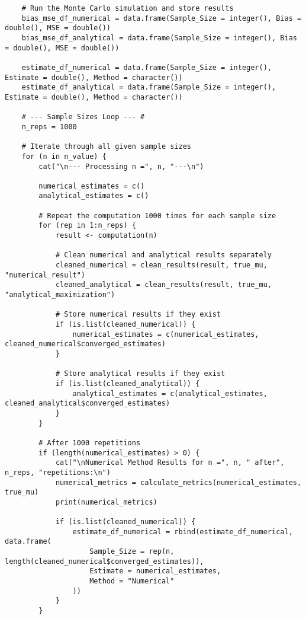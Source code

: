 \begin{verbatim}
    # Run the Monte Carlo simulation and store results
    bias_mse_df_numerical = data.frame(Sample_Size = integer(), Bias = double(), MSE = double())
    bias_mse_df_analytical = data.frame(Sample_Size = integer(), Bias = double(), MSE = double())

    estimate_df_numerical = data.frame(Sample_Size = integer(), Estimate = double(), Method = character())
    estimate_df_analytical = data.frame(Sample_Size = integer(), Estimate = double(), Method = character())

    # --- Sample Sizes Loop --- #
    n_reps = 1000

    # Iterate through all given sample sizes
    for (n in n_value) {
        cat("\n--- Processing n =", n, "---\n")

        numerical_estimates = c()
        analytical_estimates = c()

        # Repeat the computation 1000 times for each sample size
        for (rep in 1:n_reps) {
            result <- computation(n)

            # Clean numerical and analytical results separately
            cleaned_numerical = clean_results(result, true_mu, "numerical_result")
            cleaned_analytical = clean_results(result, true_mu, "analytical_maximization")

            # Store numerical results if they exist
            if (is.list(cleaned_numerical)) {
                numerical_estimates = c(numerical_estimates, cleaned_numerical$converged_estimates)
            }

            # Store analytical results if they exist
            if (is.list(cleaned_analytical)) {
                analytical_estimates = c(analytical_estimates, cleaned_analytical$converged_estimates)
            }
        }

        # After 1000 repetitions
        if (length(numerical_estimates) > 0) {
            cat("\nNumerical Method Results for n =", n, " after", n_reps, "repetitions:\n")
            numerical_metrics = calculate_metrics(numerical_estimates, true_mu)
            print(numerical_metrics)

            if (is.list(cleaned_numerical)) {
                estimate_df_numerical = rbind(estimate_df_numerical, data.frame(
                    Sample_Size = rep(n, length(cleaned_numerical$converged_estimates)),
                    Estimate = numerical_estimates,
                    Method = "Numerical"
                ))
            }
        }


\end{verbatim}
